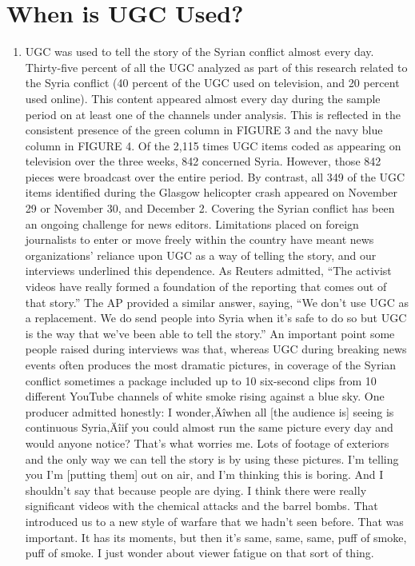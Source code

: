 \documentclass[symmetric, notoc, nobib]{towcenter-book}
\begin{document}
\section{When is UGC Used?}
\begin{enumerate}
\item UGC was used to tell the story of the Syrian conflict almost
every day.
Thirty-five percent of all the UGC analyzed as part of this research related
to the Syria conflict (40 percent of the UGC used on television, and 20 percent
used online). This content appeared almost every day during the sample
period on at least one of the channels under analysis. This is reflected
in the consistent presence of the green column in FIGURE 3 and the navy
blue column in FIGURE 4. Of the 2,115 times UGC items coded as appearing on television over the three weeks, 842 concerned Syria. However, those
842 pieces were broadcast over the entire period. By contrast, all 349 of
the UGC items identified during the Glasgow helicopter crash appeared on
November 29 or November 30, and December 2.
Covering the Syrian conflict has been an ongoing challenge for news editors.
Limitations placed on foreign journalists to enter or move freely within
the country have meant news organizations' reliance upon UGC as a way of
telling the story, and our interviews underlined this dependence. As Reuters
admitted, ``The activist videos have really formed a foundation of the reporting
that comes out of that story.'' The AP provided a similar answer, saying,
``We don't use UGC as a replacement. We do send people into Syria when
it's safe to do so but UGC is the way that we've been able to tell the story.''
An important point some people raised during interviews was that, whereas
UGC during breaking news events often produces the most dramatic pictures,
in coverage of the Syrian conflict sometimes a package included up
to 10 six-second clips from 10 different YouTube channels of white smoke
rising against a blue sky. One producer admitted honestly:
I wonder‚Äîwhen all [the audience is] seeing is continuous Syria‚Äîif
you could almost run the same picture every day and would anyone
notice? That's what worries me. Lots of footage of exteriors and the
only way we can tell the story is by using these pictures. I'm telling
you I'm [putting them] out on air, and I'm thinking this is boring.
And I shouldn't say that because people are dying. I think there were
really significant videos with the chemical attacks and the barrel
bombs. That introduced us to a new style of warfare that we hadn't
seen before. That was important. It has its moments, but then it's
same, same, same, puff of smoke, puff of smoke. I just wonder about
viewer fatigue on that sort of thing.


\end{enumerate}
\end{document}
